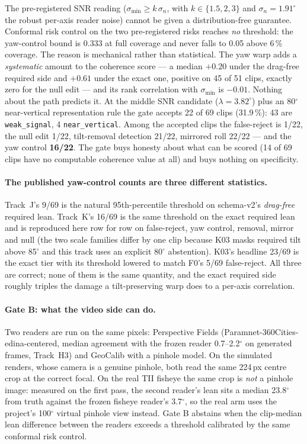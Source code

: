 The pre-registered SNR reading ($\sigma_{\min}\ge k\,\sigma_n$, with $k\in\{1.5,2,3\}$ and
$\sigma_n=1.91^\circ$ the robust per-axis reader noise) cannot be given a distribution-free
guarantee. Conformal risk control on the two pre-registered risks reaches \emph{no} threshold:
the yaw-control bound is 0.333 at full coverage and never falls to 0.05 above 6\,\% coverage.
The reason is mechanical rather than statistical. The yaw warp adds a \emph{systematic} amount
to the coherence score --- a median $+0.20$ under the drag-free required side and $+0.61$ under
the exact one, positive on 45 of 51 clips, exactly zero for the null edit --- and its rank
correlation with $\sigma_{\min}$ is $-0.01$. Nothing about the path predicts it. At the middle
SNR candidate ($\lambda=3.82^\circ$) plus an 80$^\circ$ near-vertical representation rule the
gate accepts 22 of 69 clips (31.9\,\%): 43 are \texttt{weak\_signal}, 4 \texttt{near\_vertical}.
Among the accepted clips the false-reject is 1/22, the null edit 1/22, tilt-removal detection
21/22, mirrored roll 22/22 --- and the yaw control \textbf{16/22}. The gate buys honesty about
what can be scored (14 of 69 clips have no computable coherence value at all) and buys nothing
on specificity.

\paragraph{The published yaw-control counts are three different statistics.}
Track~J's 9/69 is the natural 95th-percentile threshold on schema-v2's \emph{drag-free} required
lean. Track~K's 16/69 is the same threshold on the exact required lean and is reproduced here
row for row on false-reject, yaw control, removal, mirror and null (the two scale families
differ by one clip because K03 masks required tilt above 85$^\circ$ and this track uses an
explicit 80$^\circ$ abstention). K03's headline 23/69 is the exact tier with its threshold
lowered to match F0's 5/69 false-reject. All three are correct; none of them is the same
quantity, and the exact required side roughly triples the damage a tilt-preserving warp does to
a per-axis correlation.

\paragraph{Gate B: what the video side can do.}
Two readers are run on the same pixels: Perspective Fields
(Paramnet-360Cities-edina-centered, median agreement with the frozen reader 0.7--2.2$^\circ$ on
generated frames, Track~H3) and GeoCalib with a pinhole model. On the simulated renders, whose
camera is a genuine pinhole, both read the same 224\,px centre crop at the correct focal. On
the real TII fisheye the same crop is \emph{not} a pinhole image: measured on the first pass,
the second reader's lean sits a median 23.8$^\circ$ from truth against the frozen fisheye
reader's 3.7$^\circ$, so the real arm uses the project's 100$^\circ$ virtual pinhole view
instead. Gate B abstains when the clip-median lean difference between the readers exceeds a
threshold calibrated by the same conformal risk control.

